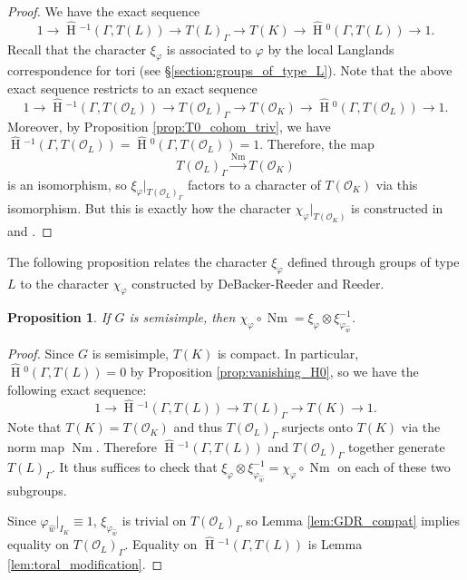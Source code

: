 \documentclass{compositio}
\theoremstyle{plain}
\newtheorem{proposition}[theorem]{Proposition}
\newcommand{\HT}[1]{\hat{\HH}{}^{#1}}
\theoremstyle{definition}
\numberwithin{equation}{section}
\DeclareMathOperator{\HH}{H}
\DeclareMathOperator{\Nm}{Nm}
\newcommand{\OK}{\mathcal{O}_K}
\newcommand{\OL}{\mathcal{O}_L}
\begin{document}
\begin{proof}
We have the exact sequence
$$1 \rightarrow \HT{-1}(\Gamma, T(L)) \rightarrow T(L)_{\Gamma} \rightarrow T(K)
  \rightarrow \HT{0}(\Gamma, T(L)) \rightarrow 1.$$
Recall that the character $\xi_{\varphi}$ is associated to $\varphi$ by
the local Langlands correspondence for tori (see \S\ref{section:groups_of_type_L}).
Note that the above exact sequence restricts to an exact sequence
$$1 \rightarrow \HT{-1}(\Gamma, T(\OL)) \rightarrow T(\OL)_{\Gamma}
  \rightarrow T(\OK) \rightarrow \HT{0}(\Gamma, T(\OL)) \rightarrow 1.$$
Moreover, by Proposition \ref{prop:T0_cohom_triv}, we have
$\HT{-1}(\Gamma, T(\OL)) = \HT{0}(\Gamma, T(\OL)) = 1$.
Therefore, the map
$$T(\OL)_{\Gamma} \xrightarrow{\Nm} T(\OK)$$
is an isomorphism, so
$\xi_{\varphi}|_{T(\OL)_{\Gamma}}$ factors to a character of
$T(\OK)$ via this isomorphism.  But this is exactly how the character
$\chi_{\varphi}|_{T(\OK)}$ is constructed in \cite{reeder-debacker:09a} and \cite{reeder:08a}.
\end{proof}

The following proposition relates the character $\xi_\varphi$ defined through groups of type $L$
to the character $\chi_\varphi$ constructed by DeBacker-Reeder and Reeder.

\begin{proposition}\label{prop:existenceofrectifier}
If $G$ is semisimple, then $\chi_{\varphi} \circ \Nm = \xi_{\varphi} \otimes \xi_{\varphi_{\hat{w}}}^{-1}$.
\end{proposition}

\begin{proof}
Since $G$ is semisimple, $T(K)$ is compact.  In particular,
$\HT{0}(\Gamma, T(L)) = 0$ by Proposition \ref{prop:vanishing_H0},
so we have the following exact sequence:
$$1 \rightarrow \HT{-1}(\Gamma, T(L)) \rightarrow T(L)_{\Gamma} \rightarrow T(K) \rightarrow 1.$$
Note that $T(K) = T(\OK)$ and thus
$T(\OL)_{\Gamma}$ surjects onto $T(K)$ via the norm map
$\Nm$.  Therefore $\HT{-1}(\Gamma,T(L))$ and
$T(\OL)_{\Gamma}$ together generate $T(L)_{\Gamma}$.  It thus suffices to check that
$\xi_{\varphi} \otimes \xi_{\varphi_{\hat{w}}}^{-1} = \chi_{\varphi} \circ \Nm$
on each of these two subgroups.

Since $\varphi_{\hat{w}}|_{I_K} \equiv 1$, $\xi_{\varphi_{\hat{w}}}$ is trivial on
$T(\OL)_{\Gamma}$ so Lemma
\ref{lem:GDR_compat} implies equality on $T(\OL)_{\Gamma}$.
Equality on $\HT{-1}(\Gamma,T(L))$ is Lemma \ref{lem:toral_modification}.
\end{proof}
\end{document}

